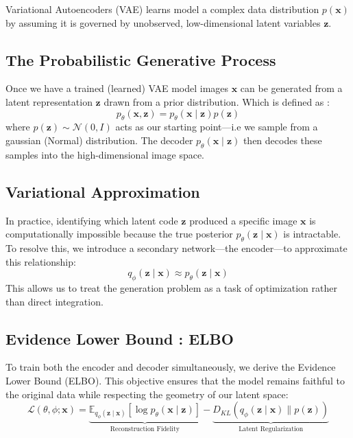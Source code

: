 \label{sec:vae_framework}

Variational Autoencoders (VAE) learns model a complex data distribution $p(\mathbf{x})$ by assuming it is governed by unobserved, low-dimensional latent variables $\mathbf{z}$. 

\subsection{The Probabilistic Generative Process}
Once we have a trained (learned) VAE model images $\mathbf{x}$ can be generated from a latent representation $\mathbf{z}$ drawn from a prior distribution. Which is defined as :
\begin{equation} 
p_\theta(\mathbf{x}, \mathbf{z}) = p_\theta(\mathbf{x} \mid \mathbf{z}) p(\mathbf{z}) 
\end{equation} 
where $p(\mathbf{z}) \sim \mathcal{N}(0, I)$ acts as our starting point—i.e we sample from a gaussian (Normal) distribution. The decoder $p_\theta(\mathbf{x} \mid \mathbf{z})$ then decodes these samples into the high-dimensional image space.

\subsection{Variational Approximation}
In practice, identifying which latent code $\mathbf{z}$ produced a specific image $\mathbf{x}$ is computationally impossible because the true posterior $p_\theta(\mathbf{z} \mid \mathbf{x})$ is intractable. To resolve this, we introduce a secondary network—the encoder—to approximate this relationship:
\begin{equation} 
q_\phi(\mathbf{z} \mid \mathbf{x}) \approx p_\theta(\mathbf{z} \mid \mathbf{x}) 
\end{equation}
This allows us to treat the generation problem as a task of optimization rather than direct integration.

\subsection{Evidence Lower Bound : ELBO}
To train both the encoder and decoder simultaneously, we derive the Evidence Lower Bound (ELBO). This objective ensures that the model remains faithful to the original data while respecting the geometry of our latent space:
\begin{equation} 
\mathcal{L}(\theta, \phi; \mathbf{x}) = \underbrace{\mathbb{E}_{q_\phi(\mathbf{z} \mid \mathbf{x})} [\log p_\theta(\mathbf{x} \mid \mathbf{z})]}_{\text{Reconstruction Fidelity}} - \underbrace{D_{KL}(q_\phi(\mathbf{z} \mid \mathbf{x}) \| p(\mathbf{z}))}_{\text{Latent Regularization}} 
\end{equation}



